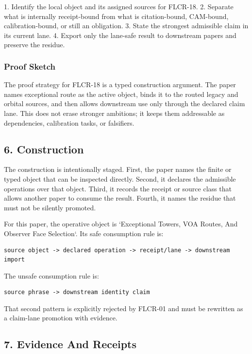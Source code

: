 \documentclass[11pt]{article}
\begin{document}
1. Identify the local object and its assigned sources for FLCR-18.
2. Separate what is internally receipt-bound from what is citation-bound, CAM-bound, calibration-bound, or still an obligation.
3. State the strongest admissible claim in its current lane.
4. Export only the lane-safe result to downstream papers and preserve the residue.

\subsubsection*{Proof Sketch}

The proof strategy for FLCR-18 is a typed construction argument. The paper names exceptional route as the active object, binds it to the routed legacy and orbital sources, and then allows downstream use only through the declared claim lane. This does not erase stronger ambitions; it keeps them addressable as dependencies, calibration tasks, or falsifiers.

\subsection*{6. Construction}

The construction is intentionally staged. First, the paper names the finite or
typed object that can be inspected directly. Second, it declares the admissible
operations over that object. Third, it records the receipt or source class that
allows another paper to consume the result. Fourth, it names the residue that
must not be silently promoted.

For this paper, the operative object is `Exceptional Towers, VOA Routes, And Observer Face Selection`. Its safe consumption
rule is:

\begin{verbatim}
source object -> declared operation -> receipt/lane -> downstream import
\end{verbatim}

The unsafe consumption rule is:

\begin{verbatim}
source phrase -> downstream identity claim
\end{verbatim}

That second pattern is explicitly rejected by FLCR-01 and must be rewritten as
a claim-lane promotion with evidence.

\subsection*{7. Evidence And Receipts}
\end{document}
